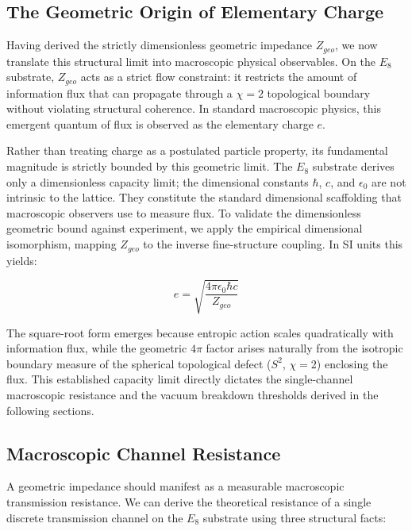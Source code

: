 \subsection{The Geometric Origin of Elementary Charge}
Having derived the strictly dimensionless geometric impedance $Z_{geo}$, we now translate this structural limit into macroscopic physical observables. On the $E_8$ substrate, $Z_{geo}$ acts as a strict flow constraint: it restricts the amount of information flux that can propagate through a $\chi=2$ topological boundary without violating structural coherence. In standard macroscopic physics, this emergent quantum of flux is observed as the elementary charge $e$. 

Rather than treating charge as a postulated particle property, its fundamental magnitude is strictly bounded by this geometric limit. The $E_8$ substrate derives only a dimensionless capacity limit; the dimensional constants $\hbar$, $c$, and $\epsilon_0$ are not intrinsic to the lattice. They constitute the standard dimensional scaffolding that macroscopic observers use to measure flux. To validate the dimensionless geometric bound against experiment, we apply the empirical dimensional isomorphism, mapping $Z_{geo}$ to the inverse fine-structure coupling. In SI units this yields:

\begin{equation}
    e = \sqrt{\frac{4\pi\epsilon_0\hbar c}{Z_{geo}}}
\end{equation}

The square-root form emerges because entropic action scales quadratically with information flux, while the geometric $4\pi$ factor arises naturally from the isotropic boundary measure of the spherical topological defect ($S^2$, $\chi=2$) enclosing the flux. This established capacity limit directly dictates the single-channel macroscopic resistance and the vacuum breakdown thresholds derived in the following sections.

\subsection{Macroscopic Channel Resistance}
A geometric impedance should manifest as a measurable macroscopic transmission resistance. We can derive the theoretical resistance of a single discrete transmission channel on the $E_8$ substrate using three structural facts:

